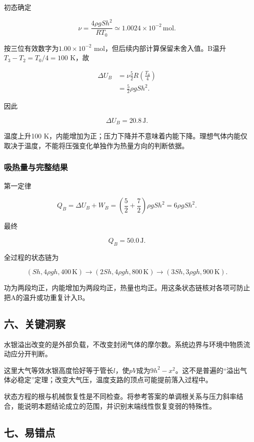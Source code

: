 \documentclass[12pt,a4paper,fontset=fandol]{ctexart}
\begin{document}
初态确定

\[
\nu=\frac{4\rho gSh^2}{RT_0}
\simeq1.0024\times10^{-2}\,\mathrm{mol}.
\]

按三位有效数字为\(1.00\times10^{-2}\)
mol，但后续内部计算保留未舍入值。B温升\(T_3-T_2=T_0/4=100\) K，故

\[
\begin{aligned}
\Delta U_B
&=\nu\frac52R\left(\frac{T_0}{4}\right)\\
&=\frac52\rho gSh^2.
\end{aligned}
\]

因此

\[
\boxed{\Delta U_B=20.8\,\mathrm J}.
\]

温度上升100
K，内能增加为正；压力下降并不意味着内能下降。理想气体内能仅取决于温度，不能将压强变化单独作为热量方向的判断依据。

\subsubsection{吸热量与完整结果}\label{ux5438ux70edux91cfux4e0eux5b8cux6574ux7ed3ux679c}

第一定律

\[
Q_B=\Delta U_B+W_B
=\left(\frac52+\frac72\right)\rho gSh^2
=6\rho gSh^2.
\]

最终

\[
\boxed{Q_B=50.0\,\mathrm J}.
\]

全过程的状态链为

\[
(Sh,4\rho gh,400\,\mathrm K)
\longrightarrow
(2Sh,4\rho gh,800\,\mathrm K)
\longrightarrow
(3Sh,3\rho gh,900\,\mathrm K).
\]

功为两段均正，内能增加为两段均正，热量也均正。用这条状态链核对各项可防止把A的温升或功重复计入B。

\subsection{六、关键洞察}\label{ux516dux5173ux952eux6d1eux5bdf-1}

水银溢出改变的是外部负载，不改变封闭气体的摩尔数。系统边界与环境中物质流动应分开判断。

这里大气等效水银高度恰好等于管长\(l\)，使\(pV\)成为\(9h^2-x^2\)。这不是普遍的``溢出气体必稳定''定理；改变大气压，温度支路的顶点可能提前落入过程中。

状态方程的根与机械恢复性是不同检查。将参考答案的单调根关系与压力斜率结合，能说明本题结论成立的范围，并识别末端线性恢复变弱的特殊性。

\subsection{七、易错点}\label{ux4e03ux6613ux9519ux70b9-1}
\end{document}
